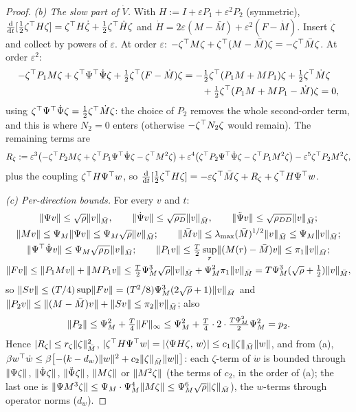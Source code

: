 \begin{proof}
\noindent\emph{(b) The slow part of $\dot V$.} With $H:=I+\varepsilon P_1+\varepsilon^2P_2$ (symmetric),
$\frac{\mathrm{d}}{\mathrm{d}t}[\frac12\zeta^\top H\zeta]=\zeta^\top H\dot\zeta+\frac12\zeta^\top\dot H\zeta$ and
$\dot H=2\varepsilon(M-\bar M)+\varepsilon^2(F-\dot M)$. Insert $\dot\zeta$ and collect by powers of $\varepsilon$.
At order $\varepsilon$: $-\zeta^\top M\zeta+\zeta^\top(M-\bar M)\zeta=-\zeta^\top\bar M\zeta$. At order $\varepsilon^2$:
\begin{align*}
  -\zeta^\top P_1M\zeta+\zeta^\top\Psi^\top\dot\Psi\zeta+\tfrac12\zeta^\top(F-\dot M)\zeta
  &=-\tfrac12\zeta^\top(P_1M+MP_1)\zeta+\tfrac12\zeta^\top\dot M\zeta\\
  &\qquad+\tfrac12\zeta^\top(P_1M+MP_1-\dot M)\zeta=0,
\end{align*}
using $\zeta^\top\Psi^\top\dot\Psi\zeta=\frac12\zeta^\top\dot M\zeta$: the choice of $P_2$ removes the whole second-order
term, and this is where $N_2=0$ enters (otherwise $-\zeta^\top N_2\zeta$ would remain). The remaining terms are
\[
  R_\zeta:=\varepsilon^3\bigl(-\zeta^\top P_2M\zeta+\zeta^\top P_1\Psi^\top\dot\Psi\zeta-\zeta^\top M^2\zeta\bigr)
  +\varepsilon^4\bigl(\zeta^\top P_2\Psi^\top\dot\Psi\zeta-\zeta^\top P_1M^2\zeta\bigr)-\varepsilon^5\zeta^\top P_2M^2\zeta,
\]
plus the coupling $\zeta^\top H\Psi^\top w$, so
$\frac{\mathrm{d}}{\mathrm{d}t}[\frac12\zeta^\top H\zeta]=-\varepsilon\zeta^\top\bar M\zeta+R_\zeta+\zeta^\top H\Psi^\top w$.

\noindent\emph{(c) Per-direction bounds.} For every $v$ and $t$:
\begin{gather*}
  \lVert \Psi v\rVert\le\sqrt\rho\lVert v\rVert_{\bar M},\qquad \lVert \dot\Psi v\rVert\le\sqrt{\rho_D}\lVert v\rVert_{\bar M},\qquad
  \lVert \ddot\Psi v\rVert\le\sqrt{\rho_{DD}}\lVert v\rVert_{\bar M};\\
  \lVert Mv\rVert\le\Psi_M\lVert \Psi v\rVert\le\Psi_M\sqrt\rho\lVert v\rVert_{\bar M};\qquad
  \lVert \bar Mv\rVert\le\lambda_{\max}(\bar M)^{1/2}\lVert v\rVert_{\bar M}\le\Psi_M\lVert v\rVert_{\bar M};\\
  \lVert \Psi^\top\dot\Psi v\rVert\le\Psi_M\sqrt{\rho_D}\lVert v\rVert_{\bar M};\qquad
  \lVert P_1v\rVert\le\tfrac T2\sup_r\lVert (M(r)-\bar M)v\rVert\le\pi_1\lVert v\rVert_{\bar M};\\
  \lVert Fv\rVert\le\lVert P_1Mv\rVert+\lVert MP_1v\rVert\le\tfrac T2\Psi_M^3\sqrt\rho\lVert v\rVert_{\bar M}+\Psi_M^2\pi_1\lVert v\rVert_{\bar M}
  =T\Psi_M^3(\sqrt\rho+\tfrac12)\lVert v\rVert_{\bar M},
\end{gather*}
so $\lVert Sv\rVert\le(T/4)\sup\lVert Fv\rVert=(T^2/8)\Psi_M^3(2\sqrt\rho+1)\lVert v\rVert_{\bar M}$ and
$\lVert P_2v\rVert\le\lVert (M-\bar M)v\rVert+\lVert Sv\rVert\le\pi_2\lVert v\rVert_{\bar M}$; also
\[
  \lVert P_2\rVert\le\Psi_M^2+\tfrac T4\lVert F\rVert_\infty\le\Psi_M^2+\tfrac T4\cdot2\cdot\tfrac{T\Psi_M^2}2\Psi_M^2=p_2.
\]
Hence
$\lvert R_\zeta\rvert\le r_\zeta\lVert \zeta\rVert^2_{\bar M}$,
$\lvert \zeta^\top H\Psi^\top w\rvert=\lvert \langle \Psi H\zeta,\, w\rangle\rvert\le c_1\lVert \zeta\rVert_{\bar M}\lVert w\rVert$, and from (a),
$\beta w^\top\dot w\le\beta\bigl[-(k-d_w)\lVert w\rVert^2+c_2\lVert \zeta\rVert_{\bar M}\lVert w\rVert\bigr]$: each $\zeta$-term of
$\dot w$ is bounded through $\lVert \Psi\zeta\rVert$, $\lVert \dot\Psi\zeta\rVert$, $\lVert \ddot\Psi\zeta\rVert$, $\lVert M\zeta\rVert$ or
$\lVert M^2\zeta\rVert$ (the terms of $c_2$, in the order of (a); the last one is
$\lVert \Psi M^3\zeta\rVert\le\Psi_M\cdot\Psi_M^4\lVert M\zeta\rVert\le\Psi_M^6\sqrt\rho\lVert \zeta\rVert_{\bar M}$), the $w$-terms
through operator norms ($d_w$).


\end{proof}
